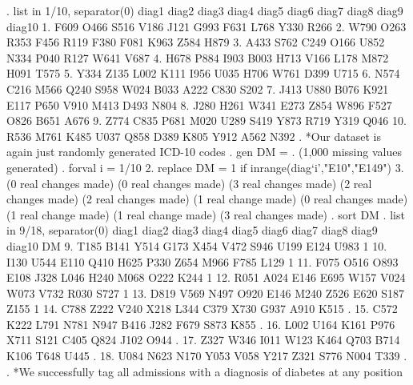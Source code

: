 . list in 1/10, separator(0)
{\smallskip}
     {\TLC}
     {\VBAR} diag1   diag2   diag3   diag4   diag5   diag6   diag7   diag8   diag9   diag10 {\VBAR}
     {\LFTT}
  1. {\VBAR}  F609    O466    S516    V186    J121    G993    F631    L768    Y330     R266 {\VBAR}
  2. {\VBAR}  W790    O263    R353    F456    R119    F380    F081    K963    Z584     H879 {\VBAR}
  3. {\VBAR}  A433    S762    C249    O166    U852    N334    P040    R127    W641     V687 {\VBAR}
  4. {\VBAR}  H678    P884    I903    B003    H713    V166    L178    M872    H091     T575 {\VBAR}
  5. {\VBAR}  Y334    Z135    L002    K111    I956    U035    H706    W761    D399     U715 {\VBAR}
  6. {\VBAR}  N574    C216    M566    Q240    S958    W024    B033    A222    C830     S202 {\VBAR}
  7. {\VBAR}  J413    U880    B076    K921    E117    P650    V910    M413    D493     N804 {\VBAR}
  8. {\VBAR}  J280    H261    W341    E273    Z854    W896    F527    O826    B651     A676 {\VBAR}
  9. {\VBAR}  Z774    C835    P681    M020    U289    S419    Y873    R719    Y319     Q046 {\VBAR}
 10. {\VBAR}  R536    M761    K485    U037    Q858    D389    K805    Y912    A562     N392 {\VBAR}
     {\BLC}
{\smallskip}
. *Our dataset is again just randomly generated ICD-10 codes
. gen DM = .
(1,000 missing values generated)
{\smallskip}
. forval i = 1/10 {\lbr}
  2. replace DM = 1 if inrange(diag`i',"E10","E149")
  3. {\rbr}
(0 real changes made)
(0 real changes made)
(3 real changes made)
(2 real changes made)
(2 real changes made)
(1 real change made)
(0 real changes made)
(1 real change made)
(1 real change made)
(3 real changes made)
{\smallskip}
. sort DM
{\smallskip}
. list in 9/18, separator(0)
{\smallskip}
     {\TLC}
     {\VBAR} diag1   diag2   diag3   diag4   diag5   diag6   diag7   diag8   diag9   diag10   DM {\VBAR}
     {\LFTT}
  9. {\VBAR}  T185    B141    Y514    G173    X454    V472    S946    U199    E124     U983    1 {\VBAR}
 10. {\VBAR}  I130    U544    E110    Q410    H625    P330    Z654    M966    F785     L129    1 {\VBAR}
 11. {\VBAR}  F075    O516    O893    E108    J328    L046    H240    M068    O222     K244    1 {\VBAR}
 12. {\VBAR}  R051    A024    E146    E695    W157    V024    W073    V732    R030     S727    1 {\VBAR}
 13. {\VBAR}  D819    V569    N497    O920    E146    M240    Z526    E620    S187     Z155    1 {\VBAR}
 14. {\VBAR}  C788    Z222    V240    X218    L344    C379    X730    G937    A910     K515    . {\VBAR}
 15. {\VBAR}  C572    K222    L791    N781    N947    B416    J282    F679    S873     K855    . {\VBAR}
 16. {\VBAR}  L002    U164    K161    P976    X711    S121    C405    Q824    J102     O944    . {\VBAR}
 17. {\VBAR}  Z327    W346    I011    W123    K464    Q703    B714    K106    T648     U445    . {\VBAR}
 18. {\VBAR}  U084    N623    N170    Y053    V058    Y217    Z321    S776    N004     T339    . {\VBAR}
     {\BLC}
{\smallskip}
. *We successfully tag all admissions with a diagnosis of diabetes at any position
